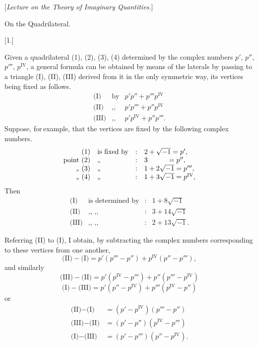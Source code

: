 
\begin{center}
[\emph{Lecture on the Theory of Imaginary Quantities.}]

On the Quadrilateral.

[1.]
\end{center}

Given a quadrilateral (1), (2), (3), (4) determined by the complex numbers $p'$, $p''$, $p'''$,
$p^{\mathrm{IV}}$, a general formula can be obtained by means of the laterals
by passing to a triangle (I), (II), (III) derived from it in the only
symmetric way, its vertices being fixed as follows.
\[
\begin{array}{rll}
\text{(I)} & \text{by} & p'p'' + p'''p^{\mathrm{IV}} \\
\text{(II)} & \text{,,} & p'p''' + p'' p^{\mathrm{IV}} \\
\text{(III)} & \text{,,} & p'p^{\mathrm{IV}} + p'' p'''.
\end{array}
\]
Suppose, for\,example, that the vertices are fixed by the following complex numbers.
\[
\begin{array}{rlll}
\text{(1)} & \text{is fixed by} & : & 2 + \sqrt{-1} = p', \\
\text{point (2)} & \text{,,} & : & 3 \hspace{2.8em} = p'', \\
\text{,, (3)} & \text{,,} & : & 1 + 2\sqrt{-1} = p''', \\
\text{,, (4)} & \text{,,} & : & 1 + 3\sqrt{-1} = p^{\mathrm{IV}},
\end{array}
\]
Then
\[
\begin{array}{rlll}
\text{(I)} & \text{is determined by} & : & 1 + 8\sqrt{-1} \\
\text{(II)} & \text{,, ,,} & : & 3 + 14\sqrt{-1} \\
\text{(III)} & \text{,, ,,} & : & 2 + 13\sqrt{-1}.
\end{array}
\]

Referring (II) to (I), I obtain, by subtracting the complex numbers corresponding to these vertices
from one another,
\[
\text{(II)} - \text{(I)} = p'(p''' - p'') + p^{\mathrm{IV}}(p'' - p'''),
\]
and similarly
\[
\text{(III)} - \text{(II)} = p'(p^{\mathrm{IV}} - p''') + p'' (p''' - p^{\mathrm{IV}})
\]
\[
\text{(I)} - \text{(III)} = p'(p'' - p^{\mathrm{IV}}) + p'''(p^{\mathrm{IV}} - p'')
\]
or
\[
\begin{array}{rl}
\text{(II)} - \text{(I)} & = (p' - p^{\mathrm{IV}})(p''' - p'') \\
\text{(III)} - \text{(II)} & = (p' - p'')(p^{\mathrm{IV}} - p''') \\
\text{(I)} - \text{(III)} & = (p' - p''')(p'' - p^{\mathrm{IV}}).
\end{array}
\]


